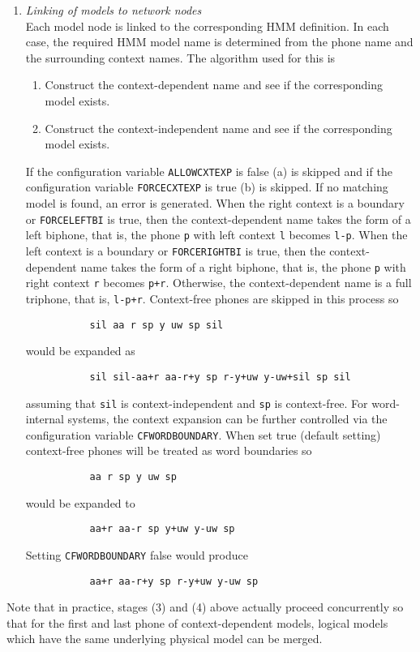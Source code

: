 \begin{enumerate}
\item \textit{Linking of models to network nodes} \\
Each model node is linked to the corresponding HMM definition.
In each case, the required HMM model name is 
determined from the phone name and the surrounding
context names.  The algorithm used for this is
\begin{enumerate}
\item Construct the context-dependent name and see if the
      corresponding model exists.
\item Construct the context-independent name and see if the
      corresponding  model exists.
\end{enumerate}
If the configuration variable \texttt{ALLOWCXTEXP} is false (a) 
is skipped and if the configuration variable \texttt{FORCECXTEXP} is true
(b) is skipped.  If no matching model is found, an error is
generated.  When the right context
is a boundary or \texttt{FORCELEFTBI} is true, then the
context-dependent name takes the form of a left biphone, that is,
the phone \texttt{p} with left context \texttt{l} becomes \texttt{l-p}. 
When the left context
is a boundary or \texttt{FORCERIGHTBI} is true, then the
context-dependent name takes the form of a right biphone, that is,
the phone \texttt{p} with right context \texttt{r} becomes \texttt{p+r}.
Otherwise, the context-dependent name is a full triphone, that is,
\texttt{l-p+r}.
Context-free phones are skipped in this process so
\begin{verbatim}
           sil aa r sp y uw sp sil
\end{verbatim}
would be expanded as
\begin{verbatim}
           sil sil-aa+r aa-r+y sp r-y+uw y-uw+sil sp sil
\end{verbatim}
assuming that \texttt{sil} is context-independent and \texttt{sp} is
context-free. 
 For word-internal systems, 
the context expansion can be further controlled via the configuration variable
\texttt{CFWORDBOUNDARY}. When set true (default setting) context-free phones
will be treated as word boundaries so
\begin{verbatim}
           aa r sp y uw sp
\end{verbatim}
would be expanded to
\begin{verbatim}
           aa+r aa-r sp y+uw y-uw sp
\end{verbatim}
Setting \texttt{CFWORDBOUNDARY} false would produce
\begin{verbatim}
           aa+r aa-r+y sp r-y+uw y-uw sp
\end{verbatim}

\end{enumerate}
Note that in practice, stages (3) and (4) above actually proceed concurrently
so that for the first and last phone of context-dependent models, logical
models which have the same underlying physical model can be merged.

